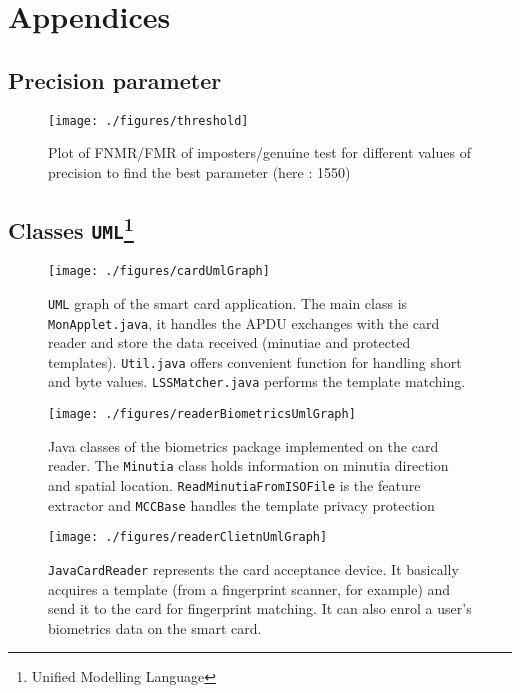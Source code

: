 \documentclass[a4paper,12pt]{article}
\begin{document}
\nocite{*}


\newpage

\appendix
\section{Appendices}

\subsection{Precision parameter}
\begin{figure}[!htbp]
    \center
    \texttt{[image: ./figures/threshold]}
    \caption{Plot of FNMR/FMR of imposters/genuine test for different values of precision to find the best parameter (here : 1550)}
    \label{threshold}
\end{figure}

\newpage
\subsection{Classes \texttt{UML}\protect\footnote{Unified Modelling Language}}
\begin{figure}[!htbp]
    \center
    \texttt{[image: ./figures/cardUmlGraph]}
    \caption{\texttt{UML} graph of the smart card application. The main class is \texttt{MonApplet.java}, it handles the APDU exchanges with the card reader and store the data received (minutiae and protected templates). \texttt{Util.java} offers convenient function for handling short and byte values. \texttt{LSSMatcher.java} performs the template matching.}
    \label{card}
\end{figure}

\begin{figure}[!htbp]
    \center
    \texttt{[image: ./figures/readerBiometricsUmlGraph]}
    \caption{Java classes of the biometrics package implemented on the card reader. The \texttt{Minutia} class holds information on minutia direction and spatial location. \texttt{ReadMinutiaFromISOFile} is the feature extractor and \texttt{MCCBase} handles the template privacy protection}
    \label{biometrics}
\end{figure}

\begin{figure}[!htbp]
    \center
    \texttt{[image: ./figures/readerClietnUmlGraph]}
    \caption{\texttt{JavaCardReader} represents the card acceptance device. It basically acquires a template (from a fingerprint scanner, for example) and send it to the card for fingerprint matching. It can also enrol a user's biometrics data on the smart card.}
    \label{javacardreader}
\end{figure}
\end{document}
